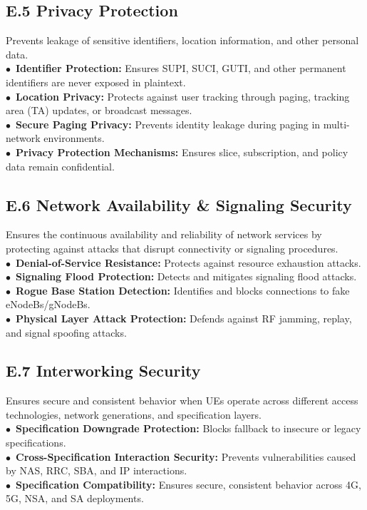 \documentclass[sigconf]{acmart}
\begin{document}
{\subsection*{E.5 Privacy Protection}
Prevents leakage of sensitive identifiers, location information, and other personal data.\\
\noindent$\bullet$~\textbf{Identifier Protection:} Ensures SUPI, SUCI, GUTI, and other permanent identifiers are never exposed in plaintext.  \\
\noindent$\bullet$~\textbf{Location Privacy:} Protects against user tracking through paging, tracking area (TA) updates, or broadcast messages.  \\
\noindent$\bullet$~\textbf{Secure Paging Privacy:} Prevents identity leakage during paging in multi-network environments.  \\
\noindent$\bullet$~\textbf{Privacy Protection Mechanisms:} Ensures slice, subscription, and policy data remain confidential.  

\subsection*{E.6 Network Availability \& Signaling Security}
Ensures the continuous availability and reliability of network services by protecting against attacks that disrupt connectivity or signaling procedures. \\
\noindent$\bullet$~\textbf{Denial-of-Service Resistance:} Protects against resource exhaustion attacks.\\
\noindent$\bullet$~\textbf{Signaling Flood Protection:} Detects and mitigates signaling flood attacks.\\
\noindent$\bullet$~\textbf{Rogue Base Station Detection:} Identifies and blocks connections to fake eNodeBs/gNodeBs.\\
\noindent$\bullet$~\textbf{Physical Layer Attack Protection:} Defends against RF jamming, replay, and signal spoofing attacks.






\subsection*{E.7 Interworking Security}
Ensures secure and consistent behavior when UEs operate across different access technologies, network generations, and specification layers. \\
\noindent$\bullet$~\textbf{Specification Downgrade Protection:} Blocks fallback to insecure or legacy specifications.\\
\noindent$\bullet$~\textbf{Cross-Specification Interaction Security:} Prevents vulnerabilities caused by NAS, RRC, SBA, and IP interactions.\\
\noindent$\bullet$~\textbf{Specification Compatibility:} Ensures secure, consistent behavior across 4G, 5G, NSA, and SA deployments.



}
\end{document}
